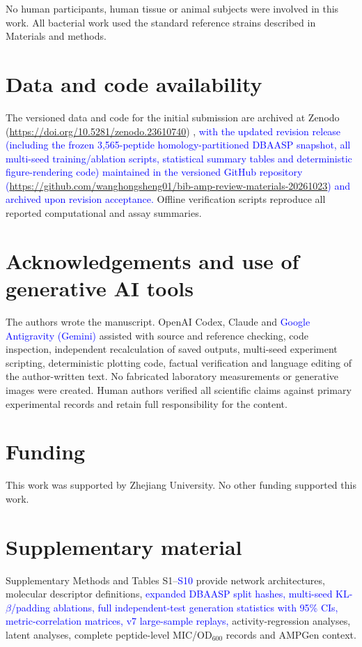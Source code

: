 \documentclass[unnumsec,webpdf,contemporary,large]{oup-authoring-template}
\newcommand{\rev}[1]{\textcolor{blue}{#1}}
\begin{document}
No human participants, human tissue or animal subjects were involved in this work. All bacterial work used the standard reference strains described in Materials and methods.

\section*{Data and code availability}
The versioned data and code for the initial submission are archived at Zenodo (\url{https://doi.org/10.5281/zenodo.23610740}) \cite{refData}, \rev{with the updated revision release (including the frozen 3,565-peptide homology-partitioned DBAASP snapshot, all multi-seed training/ablation scripts, statistical summary tables and deterministic figure-rendering code) maintained in the versioned GitHub repository (\url{https://github.com/wanghongsheng01/bib-amp-review-materials-20261023}) and archived upon revision acceptance.} Offline verification scripts reproduce all reported computational and assay summaries.

\section*{Acknowledgements and use of generative AI tools}

The authors wrote the manuscript. OpenAI Codex, Claude and \rev{Google Antigravity (Gemini)} assisted with source and reference checking, code inspection, independent recalculation of saved outputs, multi-seed experiment scripting, deterministic plotting code, factual verification and language editing of the author-written text. No fabricated laboratory measurements or generative images were created. Human authors verified all scientific claims against primary experimental records and retain full responsibility for the content.

\section*{Funding}

This work was supported by Zhejiang University. No other funding supported this work.

\section*{Supplementary material}
Supplementary Methods and Tables S1--\rev{S10} provide network architectures, molecular descriptor definitions, \rev{expanded DBAASP split hashes, multi-seed KL-$\beta$/padding ablations, full independent-test generation statistics with 95\% CIs, metric-correlation matrices, v7 large-sample replays,} activity-regression analyses, latent analyses, complete peptide-level MIC/OD$_{600}$ records and AMPGen context.
\end{document}
